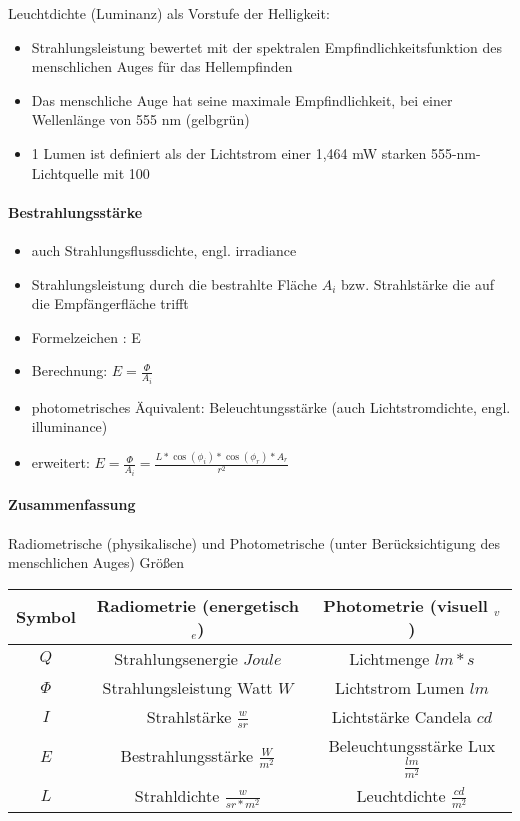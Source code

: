 \documentclass[10pt,landscape]{article}
\begin{document}
\begin{multicols}{3}
  Leuchtdichte (Luminanz) als Vorstufe der Helligkeit:
  \begin{itemize}
    \item Strahlungsleistung bewertet mit der spektralen Empfindlichkeitsfunktion des menschlichen Auges für das Hellempfinden
    \item Das menschliche Auge hat seine maximale Empfindlichkeit, bei einer Wellenlänge von 555 nm (gelbgrün)
    \item 1 Lumen ist definiert als der Lichtstrom einer 1,464 mW starken 555-nm-Lichtquelle mit 100%
  \end{itemize}
  
  
  \paragraph{Bestrahlungsstärke}
  \begin{itemize}
    \item auch Strahlungsflussdichte, engl. irradiance
    \item Strahlungsleistung durch die bestrahlte Fläche $A_i$ bzw. Strahlstärke die auf die Empfängerfläche trifft
    \item Formelzeichen : E
    \item Berechnung: $E =\frac{\Phi}{A_i}$
    \item photometrisches Äquivalent: Beleuchtungsstärke (auch Lichtstromdichte, engl. illuminance)
    \item erweitert: $E=\frac{\Phi}{A_i}=\frac{L*\cos(\phi_i)*\cos(\phi_r)*A_r}{r^2}$
  \end{itemize}
  
  \paragraph{Zusammenfassung}
  Radiometrische (physikalische) und Photometrische (unter Berücksichtigung des menschlichen Auges) Größen
  
  \begin{tabular}{ c | c | c }
    Symbol & Radiometrie (energetisch $_e$)     & Photometrie (visuell $_v$ )             \\ \hline
    $Q$    & Strahlungsenergie $Joule$          & Lichtmenge $lm*s$                       \\
    $\Phi$ & Strahlungsleistung Watt $W$        & Lichtstrom Lumen $lm$                   \\
    $I$    & Strahlstärke $\frac{w}{sr}$        & Lichtstärke Candela $cd$                \\
    $E$    & Bestrahlungsstärke $\frac{W}{m^2}$ & Beleuchtungsstärke Lux $\frac{lm}{m^2}$ \\
    $L$    & Strahldichte $\frac{w}{sr*m^2}$    & Leuchtdichte $\frac{cd}{m^2}$           \\
  \end{tabular}
  

\end{multicols}
\end{document}
